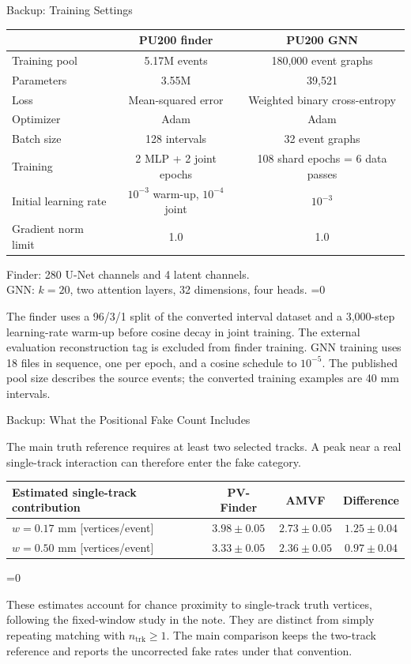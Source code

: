 \documentclass[xcolor=table,aspectratio=169]{beamer}
\newcommand{\ntrk}{\ensuremath{n_\mathrm{trk}}}
\providecommand{\talkbuild}{0}
\newcommand{\readingonly}[1]{\ifnum\talkbuild=0\relax#1\fi}
\newcommand{\readingnote}[1]{\readingonly{\par\vspace{.35em}%
  {\footnotesize\color{black!65}#1\par}}}
\newcommand{\takeaway}[1]{\par\vspace{.65em}{\centering
  \setlength{\fboxsep}{7pt}\colorbox{pennred!5}{\parbox{.94\linewidth}{%
  \centering\small\textcolor{pennred}{#1}}}\par}}
\begin{document}
\begin{frame}{Backup: Training Settings}
\relax

\centering\small
\begin{tabular}{lcc}\toprule
 & PU200 finder & PU200 GNN\\\midrule
Training pool & 5.17M events & 180,000 event graphs\\
Parameters & 3.55M & 39,521\\
Loss & Mean-squared error & Weighted binary cross-entropy\\
Optimizer & Adam & Adam\\
Batch size & 128 intervals & 32 event graphs\\
Training & 2 MLP + 2 joint epochs & 108 shard epochs = 6 data passes\\
Initial learning rate & $10^{-3}$ warm-up, $10^{-4}$ joint & $10^{-3}$\\
Gradient norm limit & 1.0 & 1.0\\\bottomrule
\end{tabular}
\par\vspace{1em}\small
Finder: 280 U-Net channels and 4 latent channels.\\[.5em]
GNN: $k=20$, two attention layers, 32 dimensions, four heads.
\readingnote{The finder uses a 96/3/1 split of the converted interval dataset and a 3,000-step learning-rate warm-up before cosine decay in joint training. The external evaluation reconstruction tag is excluded from finder training. GNN training uses 18 files in sequence, one per epoch, and a cosine schedule to $10^{-5}$. The published pool size describes the source events; the converted training examples are 40 mm intervals.}
\end{frame}


\begin{frame}{Backup: What the Positional Fake Count Includes}
\relax

\small The main truth reference requires at least two selected tracks. A peak near a real single-track interaction can therefore enter the fake category.
\par\vspace{1.2em}\centering\small
\begin{tabular}{lccc}\toprule
Estimated single-track contribution & PV-Finder & AMVF & Difference\\\midrule
$w=0.17$ mm [vertices/event] & $3.98\pm0.05$ & $2.73\pm0.05$ & $1.25\pm0.04$\\
$w=0.50$ mm [vertices/event] & $3.33\pm0.05$ & $2.36\pm0.05$ & $0.97\pm0.04$\\\bottomrule
\end{tabular}
\takeaway{The truth-selection effect applies to both algorithms and depends on the window.}\readingnote{These estimates account for chance proximity to single-track truth vertices, following the fixed-window study in the note. They are distinct from simply repeating matching with $\ntrk\geq1$. The main comparison keeps the two-track reference and reports the uncorrected fake rates under that convention.}
\end{frame}
\end{document}
